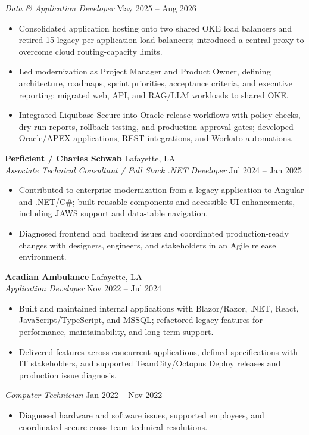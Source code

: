 \documentclass[10pt,letterpaper]{article}
\begin{document}
\textit{Data \& Application Developer} \hfill May 2025 -- Aug 2026
\begin{itemize}
  \item Consolidated application hosting onto two shared OKE load balancers and retired 15 legacy per-application load balancers; introduced a central proxy to overcome cloud routing-capacity limits.
  \item Led modernization as Project Manager and Product Owner, defining architecture, roadmaps, sprint priorities, acceptance criteria, and executive reporting; migrated web, API, and RAG/LLM workloads to shared OKE.
  \item Integrated Liquibase Secure into Oracle release workflows with policy checks, dry-run reports, rollback testing, and production approval gates; developed Oracle/APEX applications, REST integrations, and Workato automations.
\end{itemize}

\textbf{Perficient / Charles Schwab} \hfill Lafayette, LA\\[-1pt]
\textit{Associate Technical Consultant / Full Stack .NET Developer} \hfill Jul 2024 -- Jan 2025
\begin{itemize}
  \item Contributed to enterprise modernization from a legacy application to Angular and .NET/C\#; built reusable components and accessible UI enhancements, including JAWS support and data-table navigation.
  \item Diagnosed frontend and backend issues and coordinated production-ready changes with designers, engineers, and stakeholders in an Agile release environment.
\end{itemize}

\textbf{Acadian Ambulance} \hfill Lafayette, LA\\[-1pt]
\textit{Application Developer} \hfill Nov 2022 -- Jul 2024
\begin{itemize}
  \item Built and maintained internal applications with Blazor/Razor, .NET, React, JavaScript/TypeScript, and MSSQL; refactored legacy features for performance, maintainability, and long-term support.
  \item Delivered features across concurrent applications, defined specifications with IT stakeholders, and supported TeamCity/Octopus Deploy releases and production issue diagnosis.
\end{itemize}
\textit{Computer Technician} \hfill Jan 2022 -- Nov 2022
\begin{itemize}
  \item Diagnosed hardware and software issues, supported employees, and coordinated secure cross-team technical resolutions.
\end{itemize}
\end{document}
